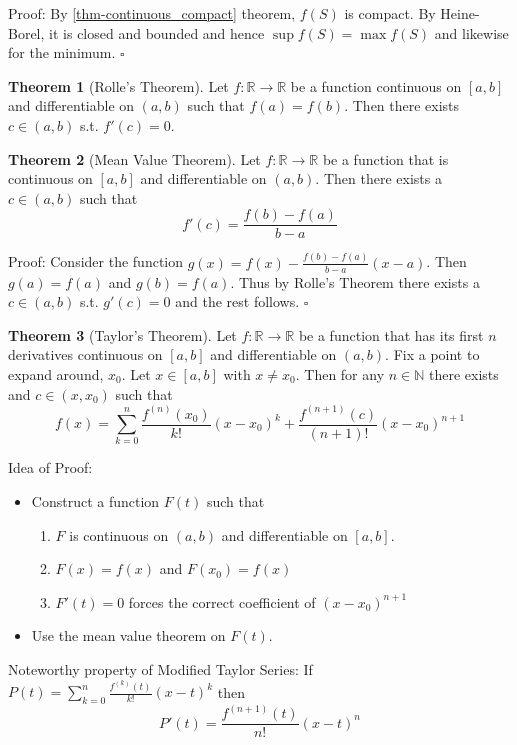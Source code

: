 \documentclass[12pt]{article}
\theoremstyle{definition}
\newtheorem{thm}{Theorem}
\def\N{{\mathbb N}}
\def\R{{\mathbb R}}
\begin{document}
Proof: By \ref{thm-continuous_compact} theorem, $ f(S) $ is compact. By Heine-Borel, it is closed and bounded and hence $ \sup f(S)=\max f(S)$ and likewise for the minimum. $ \square $  

\begin{thm}[Rolle's Theorem]
    Let $ f:\R \to \R $ be a function continuous on $ [a,b] $ and differentiable on $ (a,b) $ such that $ f(a)=f(b) $. Then there exists $ c \in (a,b) $ s.t. $ f'(c)=0 $. 
\end{thm}

\begin{thm}[Mean Value Theorem]
    Let $f:\R \to \R$ be a function that is continuous on $[a,b]$ and differentiable on $(a,b)$. Then there exists a $c\in (a,b)$ such that
   $$ f'(c)= \frac{f(b)-f(a)}{b-a} $$  
\end{thm}

Proof: Consider the function $g(x)=f(x)- \frac{f(b)-f(a)}{b-a}(x-a)$. Then $ g(a)=f(a) $ and $ g(b)=f(a) $. Thus by Rolle's Theorem there exists a $c\in (a,b)$ s.t. $ g'(c)=0 $ and the rest follows. $\square$

\begin{thm}[Taylor's Theorem]
    Let $ f: \R \to \R $ be a  function that has its first $n$ derivatives continuous on $[a,b]$ and differentiable on $ (a,b) $. Fix a point to expand around, $ x_0 $. Let $ x \in [a,b]$ with $ x\neq x_0 $. Then for any $n\in \N$ there exists and $c \in (x,x_0)$ such that
    $$f(x)= \sum_{k=0}^{n} \frac{f^{(n)}(x_0)}{k!} (x-x_0)^k + \frac{f^{(n+1)}(c)}{(n+1)!}(x-x_0)^{n+1}$$  

\end{thm}

Idea of Proof:
\begin{itemize}
    \item Construct a function $F(t)$ such that 
    \begin{enumerate}
	\item $ F $ is continuous on $ (a,b) $ and differentiable on $ [a,b] $.
	\item $F(x)=f(x)$ and $ F(x_0)=f(x) $ 
	\item $F'(t)=0$ forces the correct coefficient of $ (x-x_0)^{n+1} $ 
    \end{enumerate}
\item Use the mean value theorem on $F(t)$.
\end{itemize}


Noteworthy property of Modified Taylor Series:
If $P(t)= \sum_{k=0}^{n} \frac{f^{(k)}(t)}{k!} (x-t)^k$ 
then $$ P'(t)= \frac{f^{(n+1)}(t)}{n!}(x-t)^{n} $$ 
\end{document}
